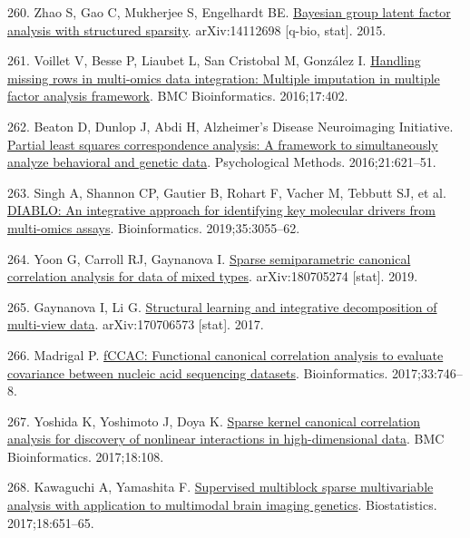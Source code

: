 \documentclass[
  12pt,
  a4paper,
  twoside,
  openright]{book}
\newlength{\cslhangindent}
\newlength{\cslentryspacingunit} %
\newenvironment{CSLReferences}[2] %
 {%
  \setlength{\parindent}{0pt}
  \ifodd #1
  \let\oldpar\par
  \def\par{\hangindent=\cslhangindent\oldpar}
  \fi
  \setlength{\parskip}{#2\cslentryspacingunit}
 }%
 {}
\begin{document}
\begin{CSLReferences}{0}{0}
\leavevmode{}%
260. Zhao S, Gao C, Mukherjee S, Engelhardt BE. \href{http://arxiv.org/abs/1411.2698}{Bayesian group latent factor analysis with structured sparsity}. arXiv:14112698 {[}q-bio, stat{]}. 2015.

\leavevmode{}%
261. Voillet V, Besse P, Liaubet L, San Cristobal M, González I. \href{https://doi.org/10.1186/s12859-016-1273-5}{Handling missing rows in multi-omics data integration: Multiple imputation in multiple factor analysis framework}. BMC Bioinformatics. 2016;17:402.

\leavevmode{}%
262. Beaton D, Dunlop J, Abdi H, Alzheimer's Disease Neuroimaging Initiative. \href{https://doi.org/10.1037/met0000053}{Partial least squares correspondence analysis: A framework to simultaneously analyze behavioral and genetic data}. Psychological Methods. 2016;21:621--51.

\leavevmode{}%
263. Singh A, Shannon CP, Gautier B, Rohart F, Vacher M, Tebbutt SJ, et al. \href{https://doi.org/10.1093/bioinformatics/bty1054}{DIABLO: An integrative approach for identifying key molecular drivers from multi-omics assays}. Bioinformatics. 2019;35:3055--62.

\leavevmode{}%
264. Yoon G, Carroll RJ, Gaynanova I. \href{http://arxiv.org/abs/1807.05274}{Sparse semiparametric canonical correlation analysis for data of mixed types}. arXiv:180705274 {[}stat{]}. 2019.

\leavevmode{}%
265. Gaynanova I, Li G. \href{http://arxiv.org/abs/1707.06573}{Structural learning and integrative decomposition of multi-view data}. arXiv:170706573 {[}stat{]}. 2017.

\leavevmode{}%
266. Madrigal P. \href{https://doi.org/10.1093/bioinformatics/btw724}{fCCAC: Functional canonical correlation analysis to evaluate covariance between nucleic acid sequencing datasets}. Bioinformatics. 2017;33:746--8.

\leavevmode{}%
267. Yoshida K, Yoshimoto J, Doya K. \href{https://doi.org/10.1186/s12859-017-1543-x}{Sparse kernel canonical correlation analysis for discovery of nonlinear interactions in high-dimensional data}. BMC Bioinformatics. 2017;18:108.

\leavevmode{}%
268. Kawaguchi A, Yamashita F. \href{https://doi.org/10.1093/biostatistics/kxx011}{Supervised multiblock sparse multivariable analysis with application to multimodal brain imaging genetics}. Biostatistics. 2017;18:651--65.


\end{CSLReferences}
\end{document}
